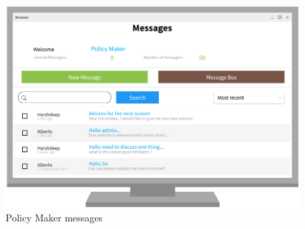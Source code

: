 \begin{figure}[H]
	
	\centering
	
	\includegraphics[width=0.8\columnwidth]{Images/messages_policy_maker.png}
	
	\caption{Policy Maker messages}
	
	\label{Fig:interface_messages_policy_maker}
	
\end{figure}